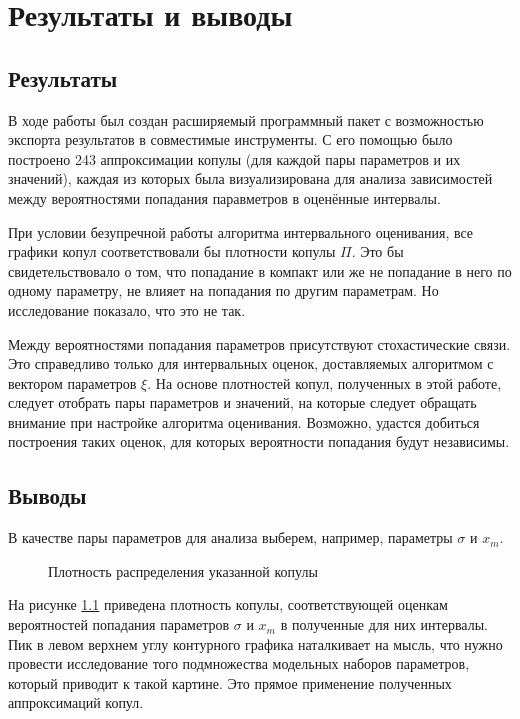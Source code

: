 \chapter{Результаты и выводы}	%

\section*{Результаты}

В ходе работы был создан расширяемый программный пакет с возможностью экспорта результатов в совместимые инструменты. С его помощью было построено 243 аппроксимации копулы (для каждой пары параметров и их значений), каждая из которых была визуализирована для анализа зависимостей между вероятностями попадания паравметров в оценённые интервалы.

При условии безупречной работы алгоритма интервального оценивания, все графики копул соответствовали бы плотности копулы $\Pi$. Это бы свидетельствовало о том, что попадание в компакт или же не попадание в него по одному параметру, не влияет на попадания по другим параметрам. Но исследование показало, что это не так.

Между вероятностями попадания параметров присутствуют стохастические связи. Это справедливо только для интервальных оценок, доставляемых алгоритмом с вектором параметров $\xi$. На основе плотностей копул, полученных в этой работе, следует отобрать пары параметров и значений, на которые следует обращать внимание при настройке алгоритма оценивания. Возможно, удастся добиться построения таких оценок, для которых вероятности попадания будут независимы.

\section*{Выводы}

В качестве пары параметров для анализа выберем, например, параметры $\sigma$ и $x_m$.
\begin{figure}[h]
	{}
	\caption{ Плотность распределения указанной копулы}
	\label{fig:smallxm}
\end{figure}
На рисунке \ref{fig:smallxm} приведена плотность копулы, соответствующей оценкам вероятностей попадания параметров $\sigma$ и $x_m$ в полученные для них интервалы. Пик в левом верхнем углу контурного графика наталкивает на мысль, что нужно провести исследование того подмножества модельных наборов параметров, который приводит к такой картине. Это прямое применение полученных аппроксимаций копул.

